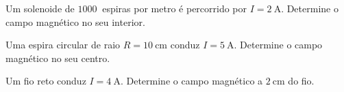 \blocoaplicacao
\begin{questao}[2]{}

Um solenoide de $\SI{1000}{}$ espiras por metro é percorrido por
$I = \SI{2}{\ampere}$. Determine o campo magnético no seu interior.


\end{questao}
\begin{questao}[2]{}

Uma espira circular de raio $R = \SI{10}{\centi\meter}$ conduz
$I = \SI{5}{\ampere}$. Determine o campo magnético no seu centro.


\end{questao}
\begin{questao}[2]{}

Um fio reto conduz $I = \SI{4}{\ampere}$. Determine o campo magnético a
$\SI{2}{\centi\meter}$ do fio.


\end{questao}

